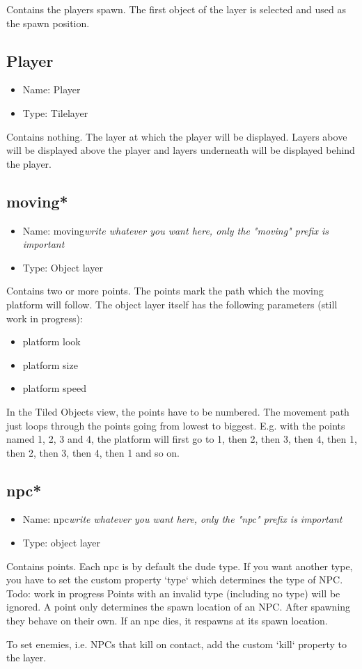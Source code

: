 \documentclass{article}
\begin{document}
Contains the players spawn. The first object of the layer is selected and used as the spawn position.

\subsection{Player}
\begin{itemize}
	\item Name: Player
	\item Type: Tilelayer
\end{itemize}

Contains nothing. The layer at which the player will be displayed. Layers above will be displayed above the player and layers underneath will be displayed behind the player.

\subsection{moving*}
\begin{itemize}
	\item Name: moving\textit{write whatever you want here, only the "moving" prefix is important}
	\item Type: Object layer
\end{itemize}

Contains two or more points. The points mark the path which the moving platform will follow. The object layer itself has the following parameters (still work in progress):
\begin{itemize}
 	\item platform look
 	\item platform size
 	\item platform speed
\end{itemize}

In the Tiled Objects view, the points have to be numbered. The movement path just loops through the points going from lowest to biggest. E.g. with the points named 1, 2, 3 and 4, the platform will first go to 1, then 2, then 3, then 4, then 1, then 2, then 3, then 4, then 1 and so on.

\subsection{npc*}
\begin{itemize}
	\item Name: npc\textit{write whatever you want here, only the "npc" prefix is important}
	\item Type: object layer
\end{itemize}

Contains points. Each npc is by default the dude type. If you want another type, you have to set the custom property `type` which determines the type of NPC. Todo: work in progress
Points with an invalid type (including no type) will be ignored.
A point only determines the spawn location of an NPC. After spawning they behave on their own. If an npc dies, it respawns at its spawn location.

To set enemies, i.e. NPCs that kill on contact, add the custom `kill` property to the layer.
\end{document}
